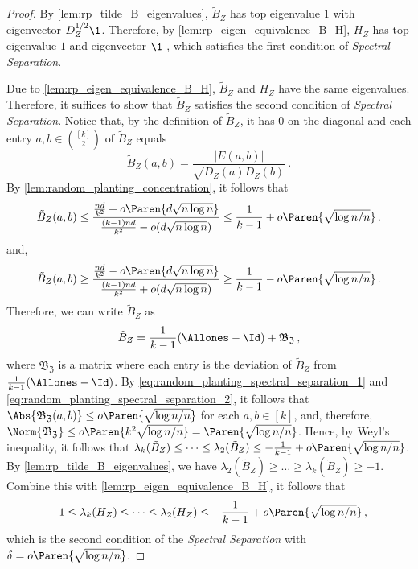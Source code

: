 \begin{proof}
    By \cref{lem:rp_tilde_B_eigenvalues}, $\tilde{B}_Z$ has top eigenvalue $1$ with eigenvector $D_Z^{1/2} \1$. Therefore, by \cref{lem:rp_eigen_equivalence_B_H}, $H_Z$ has top eigenvalue $1$ and eigenvector $\1$ , which satisfies the first condition of \emph{Spectral Separation}.
    
    Due to \cref{lem:rp_eigen_equivalence_B_H}, $\tilde{B}_Z$ and $H_Z$ have the same eigenvalues.
    Therefore, it suffices to show that $\tilde{B}_Z$ satisfies the second condition of \emph{Spectral Separation}.
    Notice that, by the definition of $\tilde{B}_Z$, it has $0$ on the diagonal and each entry $a, b \in \binom{[k]}{2}$ of $\tilde{B}_Z$ equals
    \begin{equation*}
        \tilde{B}_Z(a, b)
        = \frac{|E(a, b)|}{\sqrt{D_Z(a) D_Z(b)}} \,.
    \end{equation*}
    By \cref{lem:random_planting_concentration}, it follows that
    \begin{equation}
    \label{eq:random_planting_spectral_separation_1}
        \tilde{B}_Z(a, b)
        \leq \frac{\frac{nd}{k^2} + o \Paren{d \sqrt{n \log n}}}{\frac{(k-1)nd}{k^2} - o(d \sqrt{n \log n})}
        \leq \frac{1}{k-1} + o \Paren{\sqrt{\log n/n}} \,.
    \end{equation}
    and,
    \begin{equation}
    \label{eq:random_planting_spectral_separation_2}
        \tilde{B}_Z(a, b)
        \geq \frac{\frac{nd}{k^2} - o \Paren{d \sqrt{n \log n}}}{\frac{(k-1)nd}{k^2} + o(d \sqrt{n \log n})}
        \geq \frac{1}{k-1} - o \Paren{\sqrt{\log n/n}} \,.
    \end{equation}
    Therefore, we can write $\tilde{B}_Z$ as
    \begin{equation*}
        \tilde{B}_Z
        = \frac{1}{k-1} (\Allones - \Id) + \mathfrak{B_Z} \,,
    \end{equation*}
    where $\mathfrak{B_Z}$ is a matrix where each entry is the deviation of $\tilde{B}_Z$ from $\frac{1}{k-1} (\Allones - \Id)$.
    By \cref{eq:random_planting_spectral_separation_1} and \cref{eq:random_planting_spectral_separation_2}, it follows that $\Abs{\mathfrak{B_Z}(a, b)} \leq o \Paren{\sqrt{\log n/n}}$ for each $a, b \in [k]$, and, therefore, $\Norm{\mathfrak{B_Z}} \leq o \Paren{k^2 \sqrt{\log n/n}} = \Paren{\sqrt{\log n/n}}$.
    Hence, by Weyl's inequality, it follows that $\lambda_k(\tilde{B}_Z) \leq \dots \leq \lambda_2(\tilde{B}_Z) \leq - \frac{1}{k-1} + o \Paren{\sqrt{\log n/n}}$. By \cref{lem:rp_tilde_B_eigenvalues}, we have $\lambda_2(\tilde{B}_Z) \geq \dots \geq \lambda_k(\tilde{B}_Z) \geq -1$. Combine this with \cref{lem:rp_eigen_equivalence_B_H}, it follows that
    \begin{equation*}
        -1 \leq \lambda_k(H_Z) \leq \dots \leq \lambda_2(H_Z) \leq - \frac{1}{k-1} + o \Paren{\sqrt{\log n/n}} \,,
    \end{equation*}
    which is the second condition of the \emph{Spectral Separation} with $\delta=o \Paren{\sqrt{\log n/n}}$.
\end{proof}

